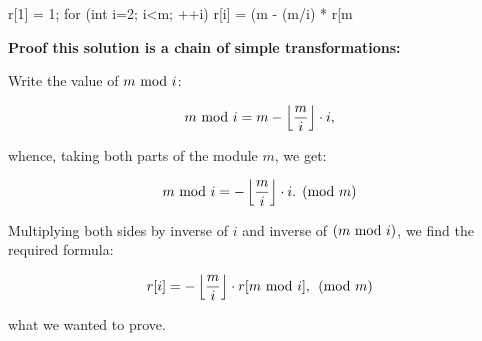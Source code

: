 \code
r[1] = 1;
for (int i=2; i<m; ++i)
r[i] = (m - (m/i) * r[m%
\endcode

\bf{Proof} this solution is a chain of simple transformations:

Write the value of $m {\rm~mod~} i$:

$$ m {\rm~mod~} i = m - \left\lfloor \frac{m}{i} \right\rfloor \cdot i, $$

whence, taking both parts of the module $m$, we get:

$$ m {\rm~mod~} i = - \left\lfloor \frac{m}{i} \right\rfloor \cdot i. \pmod m $$

Multiplying both sides by inverse of $i$ and inverse of $(m {\rm~mod~} i)$, we find the required formula:

$$ r[i] = - \left\lfloor \frac{m}{i} \right\rfloor \cdot r[m {\rm~mod~} i], \pmod m $$

what we wanted to prove.
